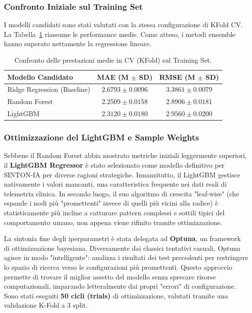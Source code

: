 \subsubsection*{Confronto Iniziale sul Training Set}
I modelli candidati sono stati valutati con la stessa configurazione di KFold CV. La Tabella~\ref{tab:model_comparison} riassume le performance medie. Come atteso, i metodi ensemble hanno superato nettamente la regressione lineare.

\begin{table}[H]
    \centering
    \begin{tabular}{|l|c|c|}
        \hline
        \textbf{Modello Candidato}  & \textbf{MAE (M $\pm$ SD)} & \textbf{RMSE (M $\pm$ SD)} \\
        \hline
        Ridge Regression (Baseline) & $2.6793 \pm 0.0096$       & $3.3861 \pm 0.0079$        \\
        Random Forest               & $2.2509 \pm 0.0158$       & $2.8906 \pm 0.0181$        \\
        LightGBM                    & $2.3120 \pm 0.0180$       & $2.9560 \pm 0.0200$        \\
        \hline
    \end{tabular}
    \caption{Confronto delle prestazioni medie in CV (KFold) sul Training Set.}
    \label{tab:model_comparison}
\end{table}

\subsubsection*{Ottimizzazione del LightGBM e Sample Weights}
Sebbene il Random Forest abbia mostrato metriche iniziali leggermente superiori, il \textbf{LightGBM Regressor} è stato selezionato come modello definitivo per SINTON-IA per diverse ragioni strategiche. Innanzitutto, il LightGBM gestisce nativamente i valori mancanti, una caratteristica frequente nei dati reali di telemetria clinica. In secondo luogo, il suo algoritmo di crescita "leaf-wise" (che espande i nodi più "promettenti" invece di quelli più vicini alla radice) è statisticamente più incline a catturare pattern complessi e sottili tipici del comportamento umano, non appena viene rifinito tramite ottimizzazione.

La sintonia fine degli iperparametri è stata delegata ad \textbf{Optuna}, un framework di ottimizzazione bayesiana. Diversamente dai classici tentativi casuali, Optuna agisce in modo "intelligente": analizza i risultati dei test precedenti per restringere lo spazio di ricerca verso le configurazioni più promettenti. Questo approccio permette di trovare il miglior assetto del modello senza sprecare risorse computazionali, imparando letteralmente dai propri "errori" di configurazione. Sono stati eseguiti \textbf{50 cicli (trials)} di ottimizzazione, valutati tramite una validazione K-Fold a 3 split.


